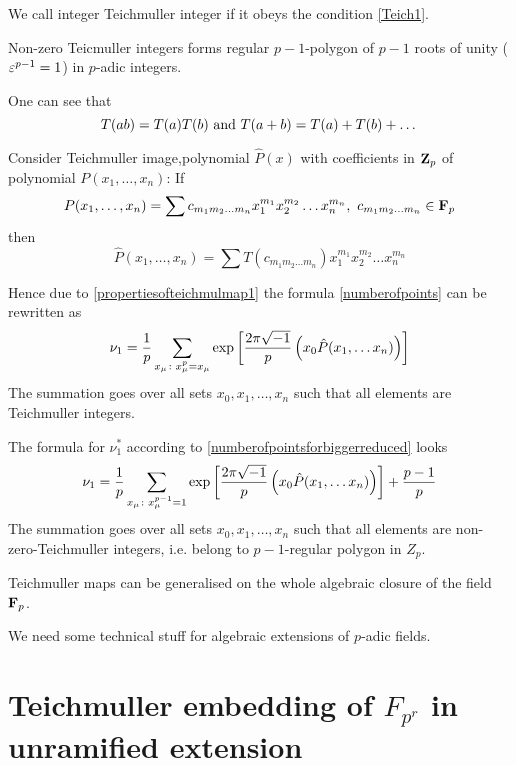 \documentclass[12pt]{article}
\theoremstyle{theorem}
\numberwithin{equation}{section}
\begin{document}
We call integer Teichmuller integer if it obeys the condition \eqref{Teich1}.

Non-zero Teicmuller integers forms regular $p-1$-polygon of $p-1$ roots of unity
(${\varepsilon}^{p-1}=1$) in $p$-adic integers.

  One can see that
  \begin{equation}\label{propertiesofteichmulmap1}
   T(ab)=T(a)T(b)\,\,{\rm and}\,\, T(a+b)=T(a)+T(b)+\dots
\end{equation}

Consider Teichmuller image,polynomial $\hat P(x)$ with coefficients in ${\bf Z}_p$ of polynomial $P(x_1,\dots,x_n)$:
 If
    $$
  P(x_1,\dots,x_n)=\sum c_{m_1m_2\dots m_n}x_1^{m_1}x_2^{m_2}\dots x_n^{m_n},\,\,c_{m_1m_2\dots m_n}\in {\bf F}_p
    $$
    then
\begin{equation}\label{teichmullerimageofpolynomial}
    \hat P(x_1,\dots,x_n)=\sum T(c_{m_1m_2\dots m_n})x_1^{m_1}x_2^{m_2}\dots x_n^{m_n}
\end{equation}

Hence due to \eqref{propertiesofteichmulmap1} the formula \eqref{numberofpoints} can be rewritten as
         \begin{equation}\label{numberofpointsinteichmul}
    \nu_1={1\over p}\sum_{x_\mu\colon x_\mu^p=x_\mu}\exp
    \left[{2\pi \sqrt{-1}\over p}\left(x_0\hat P(x_1,\dots x_n)\right)\right]
\end{equation}
The summation goes over all sets  ${x_0,x_1,\dots,x_n}$ such that all elements are Teichmuller integers.

The formula for $\nu_1^*$ according to \eqref{numberofpointsforbiggerreduced} looks
      \begin{equation}\label{numberofpointsinteichmul}
    \nu_1={1\over p}\sum_{x_\mu\colon x_\mu^{p-1}=1}\exp
    \left[{2\pi \sqrt{-1}\over p}\left(x_0\hat P(x_1,\dots x_n)\right)\right]+{p-1\over p}
\end{equation}
The summation goes over all sets  ${x_0,x_1,\dots,x_n}$ such that all elements are non-zero-Teichmuller integers,
i.e. belong to $p-1$-regular polygon in $Z_p$.

Teichmuller maps can be generalised on the whole algebraic closure of the field ${\bf F}_p$.

We need some technical stuff for algebraic extensions of $p$-adic fields.

 \section {Teichmuller embedding of $F_{p^r}$ in unramified
 extension}
\end{document}
